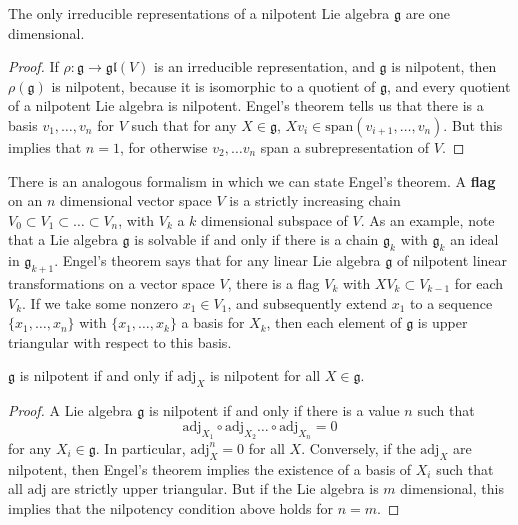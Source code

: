 \begin{corollary}
    The only irreducible representations of a nilpotent Lie algebra $\mathfrak{g}$ are one dimensional.
\end{corollary}
\begin{proof}
    If $\rho: \mathfrak{g} \to \mathfrak{gl}(V)$ is an irreducible representation, and $\mathfrak{g}$ is nilpotent, then $\rho(\mathfrak{g})$ is nilpotent, because it is isomorphic to a quotient of $\mathfrak{g}$, and every quotient of a nilpotent Lie algebra is nilpotent. Engel's theorem tells us that there is a basis $v_1, \dots, v_n$ for $V$ such that for any $X \in \mathfrak{g}$, $Xv_i \in \text{span}(v_{i+1}, \dots, v_n)$. But this implies that $n = 1$, for otherwise $v_2, \dots v_n$ span a subrepresentation of $V$.
\end{proof}

There is an analogous formalism in which we can state Engel's theorem. A {\bf flag} on an $n$ dimensional vector space $V$ is a strictly increasing chain $V_0 \subset V_1 \subset \dots \subset V_n$, with $V_k$ a $k$ dimensional subspace of $V$. As an example, note that a Lie algebra $\mathfrak{g}$ is solvable if and only if there is a chain $\mathfrak{g}_k$ with $\mathfrak{g}_k$ an ideal in $\mathfrak{g}_{k+1}$. Engel's theorem says that for any linear Lie algebra $\mathfrak{g}$ of nilpotent linear transformations on a vector space $V$, there is a flag $V_k$ with $XV_k \subset V_{k-1}$ for each $V_k$. If we take some nonzero $x_1 \in V_1$, and subsequently extend $x_1$ to a sequence $\{ x_1, \dots, x_n \}$ with $\{ x_1, \dots, x_k \}$ a basis for $X_k$, then each element of $\mathfrak{g}$ is upper triangular with respect to this basis.

\begin{corollary}
    $\mathfrak{g}$ is nilpotent if and only if $\text{adj}_X$ is nilpotent for all $X \in \mathfrak{g}$.
\end{corollary}
\begin{proof}
    A Lie algebra $\mathfrak{g}$ is nilpotent if and only if there is a value $n$ such that
    \[ \text{adj}_{X_1} \circ \text{adj}_{X_2} \dots \circ \text{adj}_{X_n} = 0 \]
    for any $X_i \in \mathfrak{g}$. In particular, $\text{adj}_X^n = 0$ for all $X$. Conversely, if the $\text{adj}_X$ are nilpotent, then Engel's theorem implies the existence of a basis of $X_i$ such that all $\text{adj}$ are strictly upper triangular. But if the Lie algebra is $m$ dimensional, this implies that the nilpotency condition above holds for $n = m$.
\end{proof}

